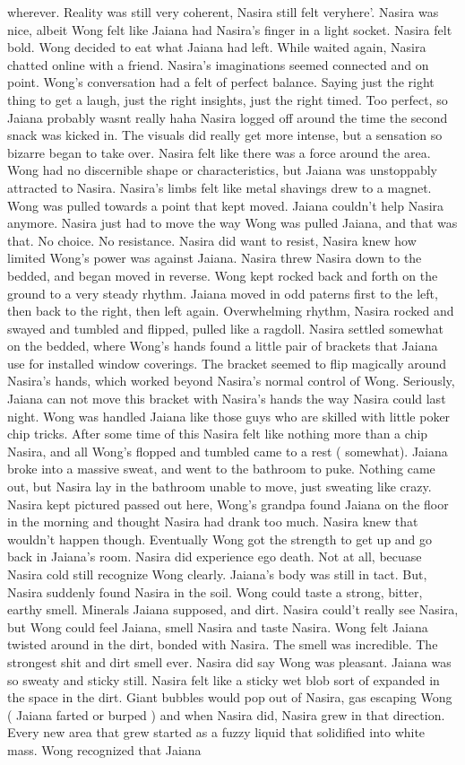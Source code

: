 \documentclass[12pt]{book}
\begin{document}
wherever. Reality was still very coherent, Nasira still felt veryhere'. Nasira was nice, albeit Wong felt like Jaiana had Nasira's finger in a light socket. Nasira felt bold. Wong decided to eat what Jaiana had left. While waited again, Nasira chatted online with a friend. Nasira's imaginations seemed connected and on point. Wong's conversation had a felt of perfect balance. Saying just the right thing to get a laugh, just the right insights, just the right timed. Too perfect, so Jaiana probably wasnt really haha Nasira logged off around the time the second snack was kicked in. The visuals did really get more intense, but a sensation so bizarre began to take over. Nasira felt like there was a force around the area. Wong had no discernible shape or characteristics, but Jaiana was unstoppably attracted to Nasira. Nasira's limbs felt like metal shavings drew to a magnet. Wong was pulled towards a point that kept moved. Jaiana couldn't help Nasira anymore. Nasira just had to move the way Wong was pulled Jaiana, and that was that. No choice. No resistance. Nasira did want to resist, Nasira knew how limited Wong's power was against Jaiana. Nasira threw Nasira down to the bedded, and began moved in reverse. Wong kept rocked back and forth on the ground to a very steady rhythm. Jaiana moved in odd paterns first to the left, then back to the right, then left again. Overwhelming rhythm, Nasira rocked and swayed and tumbled and flipped, pulled like a ragdoll. Nasira settled somewhat on the bedded, where Wong's hands found a little pair of brackets that Jaiana use for installed window coverings. The bracket seemed to flip magically around Nasira's hands, which worked beyond Nasira's normal control of Wong. Seriously, Jaiana can not move this bracket with Nasira's hands the way Nasira could last night. Wong was handled Jaiana like those guys who are skilled with little poker chip tricks. After some time of this Nasira felt like nothing more than a chip Nasira, and all Wong's flopped and tumbled came to a rest ( somewhat). Jaiana broke into a massive sweat, and went to the bathroom to puke. Nothing came out, but Nasira lay in the bathroom unable to move, just sweating like crazy. Nasira kept pictured passed out here, Wong's grandpa found Jaiana on the floor in the morning and thought Nasira had drank too much. Nasira knew that wouldn't happen though. Eventually Wong got the strength to get up and go back in Jaiana's room. Nasira did experience ego death. Not at all, becuase Nasira cold still recognize Wong clearly. Jaiana's body was still in tact. But, Nasira suddenly found Nasira in the soil. Wong could taste a strong, bitter, earthy smell. Minerals Jaiana supposed, and dirt. Nasira could't really see Nasira, but Wong could feel Jaiana, smell Nasira and taste Nasira. Wong felt Jaiana twisted around in the dirt, bonded with Nasira. The smell was incredible. The strongest shit and dirt smell ever. Nasira did say Wong was pleasant. Jaiana was so sweaty and sticky still. Nasira felt like a sticky wet blob sort of expanded in the space in the dirt. Giant bubbles would pop out of Nasira, gas escaping Wong ( Jaiana farted or burped ) and when Nasira did, Nasira grew in that direction. Every new area that grew started as a fuzzy liquid that solidified into white mass. Wong recognized that Jaiana 
\end{document}
